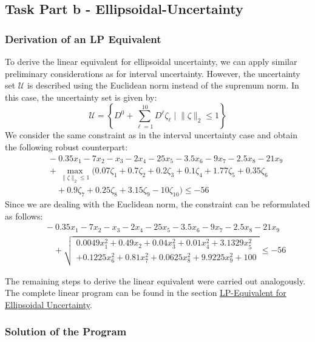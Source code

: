 \documentclass[a4paper,12pt]{article}
\begin{document}
\subsection*{Task Part b - Ellipsoidal-Uncertainty}

\subsubsection*{Derivation of an LP Equivalent}

To derive the linear equivalent for ellipsoidal uncertainty, we can apply similar preliminary considerations as for interval uncertainty. However, the uncertainty set $\mathcal{U}$ is described using the Euclidean norm instead of the supremum norm. In this case, the uncertainty set is given by:
\[
\mathcal{U} = \left\{ D^0 + \sum_{\ell=1}^{10}D^{\ell} \zeta_{\ell} \;\vert\; \|\zeta\|_2 \leq 1 \right\}
\]
We consider the same constraint as in the interval uncertainty case and obtain the following robust counterpart:
\[
\begin{aligned}
    &\quad -0.35x_1 - 7x_2 - x_3 - 2x_4 - 25x_5 - 3.5x_6 - 9x_7 - 2.5x_8 - 21x_9 \\
    &\quad + \max_{\|\zeta\|_2 \leq 1} \big( 0.07\zeta_1 + 0.7\zeta_2 + 0.2\zeta_3 + 0.1\zeta_4 + 1.77\zeta_5 +  0.35\zeta_6\\
    &\qquad + 0.9\zeta_7 + 0.25\zeta_8 + 3.15\zeta_9 - 10\zeta_{10} \big) \leq -56
\end{aligned}
\]
Since we are dealing with the Euclidean norm, the constraint can be reformulated as follows:
\[
\begin{aligned}
    &\quad -0.35x_1 - 7x_2 - x_3 - 2x_4 - 25x_5 - 3.5x_6 - 9x_7 - 2.5x_8 - 21x_9 \\
    &\qquad + \sqrt{
        \begin{aligned}0.0049x_1^2 + 0.49x_2 + 0.04x_3^2 + 0.01x_4^2 + 3.1329x_5^2 \\
            + 0.1225x_6^2 + 0.81x_7^2 + 0.0625x_8^2 + 9.9225x_9^2 + 100 \end{aligned}
            } \leq -56
\end{aligned}
\]

The remaining steps to derive the linear equivalent were carried out analogously. The complete linear program can be found in the section \hyperref[sec:lp-equivalent-ellips]{LP-Equivalent for Ellipsoidal Uncertainty}.

\subsubsection*{Solution of the Program}
\end{document}
